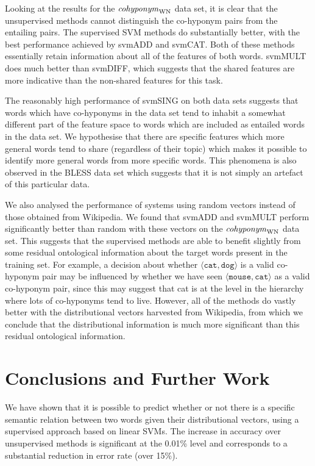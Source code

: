 \documentclass[11pt]{article}
\newcommand\coordWN{\mbox{\em cohyponym\/}_{\mbox{\scriptsize WN}}}
\begin{document}
Looking at the results for the $\coordWN$ data set, it is clear that the unsupervised methods cannot distinguish the co-hyponym pairs from the entailing pairs.  The supervised SVM methods do substantially better, with the best performance achieved by svmADD and svmCAT.  Both of these methods essentially retain information about all of the features of both words.  svmMULT does much better than svmDIFF, which suggests that the shared features are more indicative than the non-shared features for this task. 

The reasonably high performance of svmSING on both data sets suggests that words which have co-hyponyms in the data set tend to inhabit a somewhat different part of the feature space to words which are included as entailed words in the data set.  We hypothesise that there are specific features which more general words tend to share (regardless of their topic) which makes it possible to identify more general words from more specific words.  This phenomena is also observed in the BLESS data set which suggests that it is not simply an artefact of this particular data.

We also analysed the performance of systems using random vectors
instead of those obtained from Wikipedia. We found that svmADD and
svmMULT perform significantly better than random with these vectors on
the $\coordWN$ data set.  This suggests that the supervised methods
are able to benefit slightly from some residual ontological
information about the target words present in the training set.  For
example, a decision about whether
$\langle\texttt{cat},\texttt{dog}\rangle$ is a valid co-hyponym pair
may be influenced by whether we have seen
$\langle\texttt{mouse},\texttt{cat}\rangle$ as a valid co-hyponym
pair, since this may suggest that cat is at the level in the hierarchy
where lots of co-hyponyms tend to live.  However, all of the methods
do vastly better with the distributional vectors harvested from
Wikipedia, from which we conclude that the distributional information
is much more significant than this residual ontological information.

\section{Conclusions and Further Work}

We have shown that it is possible to predict whether
or not there is a specific semantic relation between two words given
their distributional vectors, using a supervised approach based on linear SVMs. The   increase in accuracy over unsupervised methods is significant at the 0.01\% level and corresponds to a substantial reduction in error rate (over 15\%).
\end{document}
